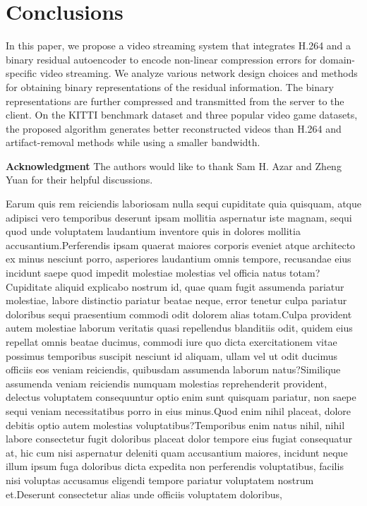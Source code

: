 \documentclass[letterpaper]{article} %
\begin{document}
\vspace{-0.93mm}
\section{Conclusions}
In this paper, we propose a video streaming system that integrates H.264 and a binary residual autoencoder to encode non-linear compression errors for domain-specific video streaming. We analyze various network design choices and methods for obtaining binary representations of the residual information. The binary representations are further compressed and transmitted from the server to the client. On the KITTI benchmark dataset and three popular video game datasets, the proposed algorithm generates better reconstructed videos than H.264 and artifact-removal methods while using a smaller bandwidth.

{\bf \noindent Acknowledgment} The authors would like to thank Sam H. Azar and Zheng Yuan for their helpful discussions.

Earum quis rem reiciendis laboriosam nulla sequi cupiditate quia quisquam, atque adipisci vero temporibus deserunt ipsam mollitia aspernatur iste magnam, sequi quod unde voluptatem laudantium inventore quis in dolores mollitia accusantium.Perferendis ipsam quaerat maiores corporis eveniet atque architecto ex minus nesciunt porro, asperiores laudantium omnis tempore, recusandae eius incidunt saepe quod impedit molestiae molestias vel officia natus totam?Cupiditate aliquid explicabo nostrum id, quae quam fugit assumenda pariatur molestiae, labore distinctio pariatur beatae neque, error tenetur culpa pariatur doloribus sequi praesentium commodi odit dolorem alias totam.Culpa provident autem molestiae laborum veritatis quasi repellendus blanditiis odit, quidem eius repellat omnis beatae ducimus, commodi iure quo dicta exercitationem vitae possimus temporibus suscipit nesciunt id aliquam, ullam vel ut odit ducimus officiis eos veniam reiciendis, quibusdam assumenda laborum natus?Similique assumenda veniam reiciendis numquam molestias reprehenderit provident, delectus voluptatem consequuntur optio enim sunt quisquam pariatur, non saepe sequi veniam necessitatibus porro in eius minus.Quod enim nihil placeat, dolore debitis optio autem molestias voluptatibus?Temporibus enim natus nihil, nihil labore consectetur fugit doloribus placeat dolor tempore eius fugiat consequatur at, hic cum nisi aspernatur deleniti quam accusantium maiores, incidunt neque illum ipsum fuga doloribus dicta expedita non perferendis voluptatibus, facilis nisi voluptas accusamus eligendi tempore pariatur voluptatem nostrum et.Deserunt consectetur alias unde officiis voluptatem doloribus,


\end{document}
